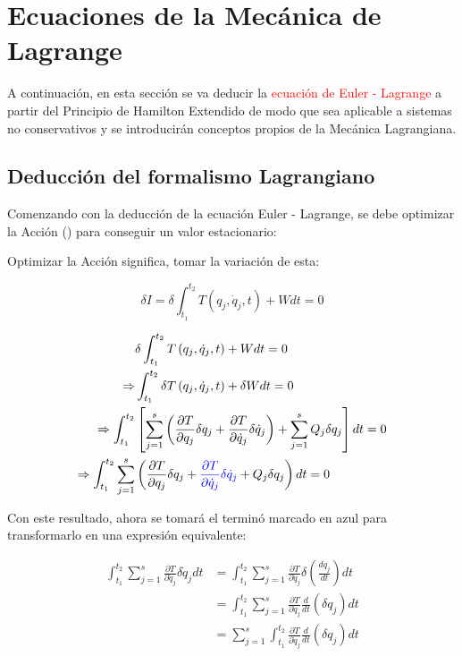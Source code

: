 \documentclass[/home/hernan/Documentos/Apuntes_mecanica_teorica/main.tex]{subfiles}
\begin{document}
    \section{Ecuaciones de la Mecánica de Lagrange}

    A continuación, en esta sección se va deducir la \textcolor{red}{ecuación de Euler - Lagrange}  a partir del Principio de Hamilton Extendido de modo que sea aplicable a sistemas no conservativos y se introducirán conceptos propios de la Mecánica Lagrangiana. \\ 

    \subsection{Deducción del formalismo Lagrangiano}

    Comenzando con la deducción de la ecuación Euler - Lagrange, se debe optimizar la Acción () para conseguir un valor estacionario:

    Optimizar la Acción significa, tomar la variación de esta:
    
    \begin{equation*}
        \delta I = \delta \int_{t_1}^{t_2} T\left(q_{j}, \dot{q}_{j}, t\right) + W dt = 0 
    \end{equation*}

    \begin{align*}
        & \delta \int_{t_1}^{t_2} T\left(q_{j}, \dot{q}_{j}, t\right) + W dt = 0 \\ 
        \Rightarrow & \int_{t_1}^{t_2} \delta T\left(q_{j}, \dot{q}_{j}, t\right) + \delta  W dt = 0 \\ 
        \Rightarrow  \int_{t_1}^{t_2}  & \left[  \sum_{j=1}^{s} \left( \frac{\partial T}{\partial q_{j}}   \delta q_{j} +\frac{\partial T}{\partial \dot{q}_{j}} \delta \dot{q}_{j}  \right) + \sum_{j=1}^{s} Q_{j} \delta q_{j}  \right] dt = 0 \\ 
        \Rightarrow \int_{t_1}^{t_2} \sum_{j=1}^{s} & \left(\frac{\partial T}{\partial q_{j}} \delta q_{j} + \textcolor{blue}{\frac{\partial T}{\partial \dot{q}_{j}} \delta \dot{q}_{j}}   + Q_{j} \delta q_{j} \right) dt = 0 \\ 
    \end{align*}

    Con este resultado, ahora se tomará el terminó marcado en azul para transformarlo en una expresión equivalente:

    \begin{align*}
        \int_{t_1}^{t_2} \sum_{j=1}^{s} \frac{\partial T}{\partial \dot{q}_{j}} \delta \dot{q}_{j} dt & = \int_{t_1}^{t_2} \sum_{j=1}^{s} \frac{\partial T}{\partial \dot{q}_{j}} \delta \left(\frac{d q_{j}}{d t}\right) dt \\ 
        & = \int_{t_1}^{t_2} \sum_{j=1}^{s} \frac{\partial T}{\partial \dot{q}_{j}} \frac{d}{d t} \left(\delta  q_{j}\right) dt \\ 
        & = \sum_{j=1}^{s} \int_{t_1}^{t_2} \frac{\partial T}{\partial \dot{q}_{j}} \frac{d}{d t} \left(\delta  q_{j}\right) dt \\ 
    \end{align*}
\end{document}
